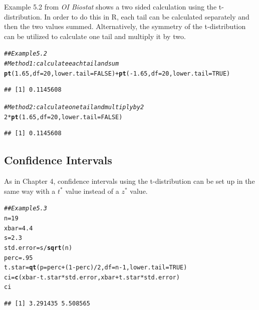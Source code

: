 \documentclass{report}\usepackage[]{graphicx}\usepackage[]{color}
\makeatletter
\newcommand{\hlnum}[1]{\textcolor[rgb]{0.686,0.059,0.569}{#1}}%
\newcommand{\hlcom}[1]{\textcolor[rgb]{0.678,0.584,0.686}{\textit{#1}}}%
\newcommand{\hlopt}[1]{\textcolor[rgb]{0,0,0}{#1}}%
\newcommand{\hlstd}[1]{\textcolor[rgb]{0.345,0.345,0.345}{#1}}%
\newcommand{\hlkwb}[1]{\textcolor[rgb]{0.69,0.353,0.396}{#1}}%
\newcommand{\hlkwc}[1]{\textcolor[rgb]{0.333,0.667,0.333}{#1}}%
\newcommand{\hlkwd}[1]{\textcolor[rgb]{0.737,0.353,0.396}{\textbf{#1}}}%
\newenvironment{kframe}{%
 \def\at@end@of@kframe{}%
 \ifinner\ifhmode%
  \def\at@end@of@kframe{\end{minipage}}%
  \begin{minipage}{\columnwidth}%
 \fi\fi%
 \def\FrameCommand##1{\hskip\@totalleftmargin \hskip-\fboxsep
 \colorbox{shadecolor}{##1}\hskip-\fboxsep
     \hskip-\linewidth \hskip-\@totalleftmargin \hskip\columnwidth}%
 \MakeFramed {\advance\hsize-\width
   \@totalleftmargin\z@ \linewidth\hsize
   \@setminipage}}%
 {\par\unskip\endMakeFramed%
 \at@end@of@kframe}
\newenvironment{knitrout}{}{} %
\makeatother
\begin{document}
Example 5.2 from \textit{OI Biostat} shows a two sided calculation using the t-distribution.  In order to do this in \textsf{R}, each tail can be calculated separately and then the two values summed.  Alternatively, the symmetry of the t-distribution can be utilized to calculate one tail and multiply it by two.  
\begin{knitrout}
\color{fgcolor}\begin{kframe}
\begin{alltt}
\hlcom{## Example 5.2 }
\hlcom{# Method 1: calculate each tail and sum }
\hlkwd{pt}\hlstd{(}\hlnum{1.65}\hlstd{,} \hlkwc{df} \hlstd{=} \hlnum{20}\hlstd{,} \hlkwc{lower.tail} \hlstd{=} \hlnum{FALSE}\hlstd{)} \hlopt{+} \hlkwd{pt}\hlstd{(}\hlopt{-}\hlnum{1.65}\hlstd{,} \hlkwc{df} \hlstd{=} \hlnum{20}\hlstd{,} \hlkwc{lower.tail} \hlstd{=} \hlnum{TRUE}\hlstd{)}
\end{alltt}
\begin{verbatim}
## [1] 0.1145608
\end{verbatim}
\begin{alltt}
\hlcom{# Method 2: calculate one tail and multiply by 2 }
\hlnum{2}\hlopt{*}\hlkwd{pt}\hlstd{(}\hlnum{1.65}\hlstd{,} \hlkwc{df} \hlstd{=} \hlnum{20}\hlstd{,} \hlkwc{lower.tail} \hlstd{=} \hlnum{FALSE}\hlstd{)}
\end{alltt}
\begin{verbatim}
## [1] 0.1145608
\end{verbatim}
\end{kframe}
\end{knitrout}


\subsection{Confidence Intervals}
As in Chapter 4, confidence intervals using the t-distribution can be set up in the same way with a $t^*$ value instead of a $z^*$ value.  

\begin{knitrout}
\color{fgcolor}\begin{kframe}
\begin{alltt}
\hlcom{## Example 5.3 }
\hlstd{n} \hlkwb{=} \hlnum{19}
\hlstd{xbar} \hlkwb{=} \hlnum{4.4}
\hlstd{s} \hlkwb{=} \hlnum{2.3}
\hlstd{std.error} \hlkwb{=} \hlstd{s}\hlopt{/}\hlkwd{sqrt}\hlstd{(n)}
\hlstd{perc} \hlkwb{=} \hlnum{.95}
\hlstd{t.star} \hlkwb{=} \hlkwd{qt}\hlstd{(}\hlkwc{p} \hlstd{= perc} \hlopt{+} \hlstd{(}\hlnum{1}\hlopt{-}\hlstd{perc)}\hlopt{/}\hlnum{2}\hlstd{,} \hlkwc{df} \hlstd{= n}\hlopt{-}\hlnum{1}\hlstd{,} \hlkwc{lower.tail} \hlstd{=} \hlnum{TRUE}\hlstd{)}
\hlstd{ci} \hlkwb{=} \hlkwd{c}\hlstd{(xbar} \hlopt{-} \hlstd{t.star}\hlopt{*}\hlstd{std.error, xbar} \hlopt{+} \hlstd{t.star}\hlopt{*}\hlstd{std.error)}
\hlstd{ci}
\end{alltt}
\begin{verbatim}
## [1] 3.291435 5.508565
\end{verbatim}
\end{kframe}
\end{knitrout}
\end{document}
